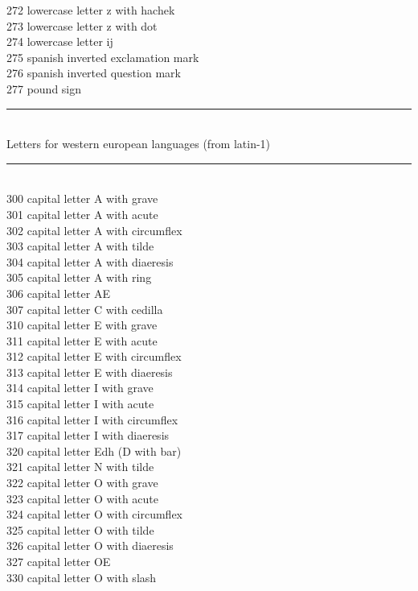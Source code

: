 \documentclass{article}
\renewcommand{\-}{\discretionary{\char'0177 }{}{}}
\begin{document}
\begin{tabbing}
272 \> lowercase letter z with hachek\\
273 \> lowercase letter z with dot\\
274 \> lowercase letter ij\\
275 \> spanish inverted exclamation mark\\
276 \> spanish inverted question mark\\
277 \> pound sign\\ 
\rule{\linewidth}{.4pt}\>\\
Letters for western european languages (from latin-1)\>\\
\rule{\linewidth}{.4pt}\>\\
300 \> capital letter A with grave\\
301 \> capital letter A with acute\\
302 \> capital letter A with circumflex\\
303 \> capital letter A with tilde\\
304 \> capital letter A with diaeresis\\
305 \> capital letter A with ring\\
306 \> capital letter AE\\
307 \> capital letter C with cedilla\\
310 \> capital letter E with grave\\
311 \> capital letter E with acute\\
312 \> capital letter E with circumflex\\
313 \> capital letter E with diaeresis\\
314 \> capital letter I with grave\\
315 \> capital letter I with acute\\
316 \> capital letter I with circumflex\\
317 \> capital letter I with diaeresis\\
320 \> capital letter Edh (D with bar)\\
321 \> capital letter N with tilde\\
322 \> capital letter O with grave\\
323 \> capital letter O with acute\\
324 \> capital letter O with circumflex\\
325 \> capital letter O with tilde\\
326 \> capital letter O with diaeresis\\
327 \> capital letter OE\\
330 \> capital letter O with slash\\

\end{tabbing}
\end{document}
